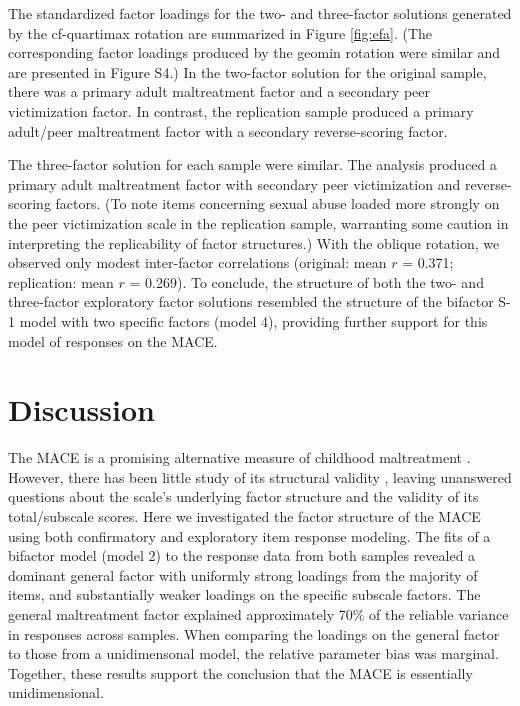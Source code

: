 \documentclass[letterpaper,man,natbib]{apa6}  %
\begin{document}
The standardized factor loadings for the two- and three-factor solutions generated by the cf-quartimax rotation are summarized in Figure \ref{fig:efa}. (The corresponding factor loadings produced by the geomin rotation were similar and are presented in Figure S4.) In the two-factor solution for the original sample, there was a primary adult maltreatment factor and a secondary peer victimization factor. In contrast, the replication sample produced a primary adult/peer maltreatment factor with a secondary reverse-scoring factor. 

The three-factor solution for each sample were similar. The analysis produced a primary adult maltreatment factor with secondary peer victimization and reverse-scoring factors. (To note items concerning sexual abuse loaded more strongly on the peer victimization scale in the replication sample, warranting some caution in interpreting the replicability of factor structures.) With the oblique rotation, we observed only modest inter-factor correlations (original: mean $r$ = 0.371; replication: mean $r$ = 0.269). To conclude, the structure of both the two- and three-factor exploratory factor solutions resembled the structure of the bifactor S-1 model with two specific factors (model 4), providing further support for this model of responses on the MACE. 

\section{Discussion}

The MACE is a promising alternative measure of childhood maltreatment \citep{georgieva2022systematic}. However, there has been little study of its structural validity \citep{saini2019systematic}, leaving unanswered questions about the scale's underlying factor structure and the validity of its total/subscale scores. Here we investigated the factor structure of the MACE using both confirmatory and exploratory item response modeling. The fits of a bifactor model (model 2) to the response data from both samples revealed a dominant general factor with uniformly strong loadings from the majority of items, and substantially weaker loadings on the specific subscale factors. The general maltreatment factor explained approximately 70\% of the reliable variance in responses across samples. When comparing the loadings on the general factor to those from a unidimensonal model, the relative parameter bias was marginal. Together, these results support the conclusion that the MACE is essentially unidimensional. 
\end{document}
